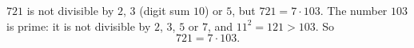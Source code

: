 $721$ is not divisible by $2$, $3$ (digit sum $10$) or $5$, but $721=7\cdot103$. The number $103$ is prime: it is not divisible by $2$, $3$, $5$ or $7$, and $11^2=121>103$. So
\[721=\boxed{7\cdot103}.\]

